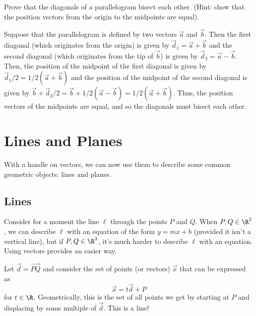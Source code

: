 \begin{exercises}
\begin{problist}
		\prob  Prove that the diagonals of a parallelogram bisect each other.  (Hint: show that
			the position vectors from the origin to the midpoints are equal).
            \begin{solution}
                Suppose that the parallelogram is defined by two vectors $\vec{a}$ and $\vec{b}$. Then
                the first diagonal (which originates from the origin) is given by $\vec{d}_1 = \vec{a} +
                \vec{b}$ and the second diagonal (which originates from the tip of $\vec{b}$) is given
                by $\vec{d}_2 = \vec{a} - \vec{b}$. Then, the position of the midpoint of the first
                diagonal is given by $\vec{d}_1 / 2 = 1/2(\vec{a} + \vec{b})$ and the position of the
                midpoint of the second diagonal is given by $\vec{b} + \vec{d}_2 / 2 = \vec{b} +
                1/2(\vec{a} - \vec{b}) = 1/2(\vec{a} + \vec{b})$. Thus, the position vectors of the
                midpoints are equal, and so the diagonals must bisect each other.
            \end{solution}

	\end{problist}
\end{exercises}



\section{Lines and Planes}

With a handle on vectors, we can now use them to describe some common geometric
objects: lines and planes.

\subsection{Lines}
Consider for a moment the line $\ell$ through the points $P$ and $Q$.  When $P,Q\in\R^2$, we
can describe $\ell$ with an equation of the form $y=mx+b$ (provided it isn't a vertical line), but if
$P,Q\in\R^3$, it's much harder to describe $\ell$ with an equation.  Using vectors
provides an easier way.

Let $\vec d=\overrightarrow{PQ}$ and consider the set of points (or vectors) $\vec x$ that can be expressed as
\[
	\vec x=t\vec d+P
\]
for $t\in \R$.  Geometrically, this is the set of all points we get by starting at $P$ and
displacing by some multiple of $\vec d$.  This is a line!


